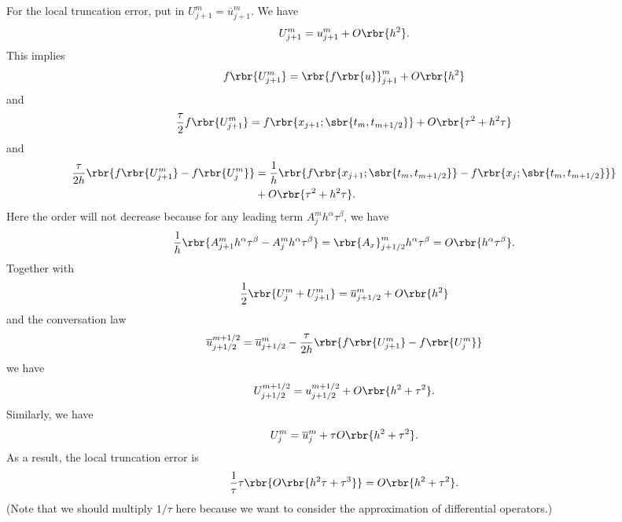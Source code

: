 \documentclass[english, nochinese]{pnote}
\begin{document}
For the local truncation error, put in $ U_{ j + 1 }^m = \overline{u}_{ j + 1 }^m $. We have
\begin{equation}
U_{ j + 1 }^m  = u_{ j + 1 }^m + O \rbr{h^2}.
\end{equation}
This implies
\begin{equation}
f \rbr{U_{ j + 1 }^m} = \rbr{ f \rbr{u} }_{ j + 1 }^m + O \rbr{h^2}
\end{equation}
and
\begin{equation}
\frac{\tau}{2} f \rbr{U_{ j + 1 }^m} = f \rbr{ x_{ j + 1 }; \sbr{ t_m, t_{ m + 1 / 2 } } } + O \rbr{ \tau^2 + h^2 \tau }
\end{equation}
and
\begin{equation}
\begin{split}
\frac{\tau}{ 2 h } \rbr{ f \rbr{U_{ j + 1 }^m} - f \rbr{U_j^m} } &= \frac{1}{h} \rbr{ f \rbr{ x_{ j + 1 }; \sbr{ t_m, t_{ m + 1 / 2 } } } - f \rbr{ x_j; \sbr{ t_m, t_{ m + 1 / 2 } } } } \\
&+ O \rbr{ \tau^2 + h^2 \tau }.
\end{split}
\end{equation}
Here the order will not decrease because for any leading term $ A_j^m h^{\alpha} \tau^{\beta} $, we have
\begin{equation}
\frac{1}{h} \rbr{ A_{ j + 1 }^m h^{\alpha} \tau^{\beta} - A_j^m h^{\alpha} \tau^{\beta} } = \rbr{A_x}_{ j + 1 / 2 }^m h^{\alpha} \tau^{\beta} = O \rbr{ h^{\alpha} \tau^{\beta} }.
\end{equation}
Together with
\begin{equation}
\frac{1}{2} \rbr{ U_j^m + U_{ j + 1 }^m } = \overline{u}_{ j + 1 / 2 }^m + O \rbr{h^2}
\end{equation}
and the conversation law
\begin{equation}
\overline{u}_{ j + 1 / 2 }^{ m + 1 / 2 } = \overline{u}_{ j + 1 / 2 }^m - \frac{\tau}{ 2 h } \rbr{ f \rbr{U_{ j + 1 }^m} - f \rbr{U_j^m} }
\end{equation}
we have
\begin{equation}
U_{ j + 1 / 2 }^{ m + 1 / 2 } = u_{ j + 1 / 2 }^{ m + 1 / 2 } + O \rbr{ h^2 + \tau^2 }.
\end{equation}
Similarly, we have
\begin{equation}
U_j^m = \overline{u}_j^m + \tau O \rbr{ h^2 + \tau^2 }.
\end{equation}
As a result, the local truncation error is
\begin{equation}
\frac{1}{\tau} \tau \rbr{ O \rbr{ h^2 \tau + \tau^3 } } = O \rbr{ h^2 + \tau^2 }.
\end{equation}
(Note that we should multiply $ 1 / \tau $ here because we want to consider the approximation of differential operators.)
\end{document}
